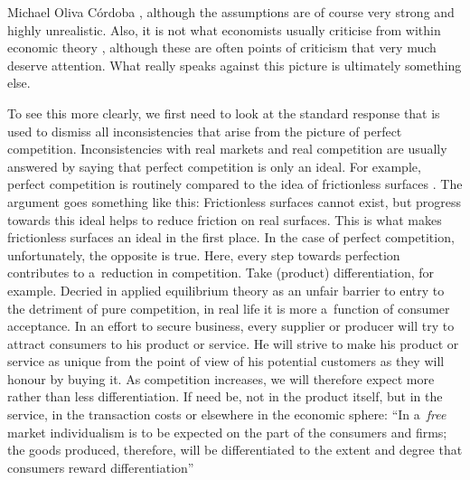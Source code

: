 \begin{artengenv}{Michael Oliva Córdoba}
\parencite[][]{friedman_methodology_1966}, %
 although the assumptions are of course very strong and highly unrealistic. Also, it is not what economists usually criticise from within economic theory 
\parencites[cf., e.g.,][]{ackerman_flawed_2004}[][]{petri_general_2003}, %
 although these are often points of criticism that very much deserve attention. What really speaks against this picture is ultimately something else.



To see this more clearly, we first need to look at the standard response that is used to dismiss all inconsistencies that arise from the picture of perfect competition. Inconsistencies with real markets and real competition are usually answered by saying that perfect competition is only an ideal. For example, perfect competition is routinely compared to the idea of frictionless surfaces 
\parencites[][]{samuelson_foundations_1947}[][]{friedman_methodology_1966}[][]{aumann_markets_1964}[][]{palgrave_macmillan_perfect_2008}. %
 The argument goes something like this: Frictionless surfaces cannot exist, but progress towards this ideal helps to reduce friction on real surfaces. This is what makes frictionless surfaces an ideal in the first place. In the case of perfect competition, unfortunately, the opposite is true. Here, every step towards perfection contributes to a~reduction in competition. Take (product) differentiation, for example. Decried in applied equilibrium theory as an unfair barrier to entry to the detriment of pure competition, in real life it is more a~function of consumer acceptance. In an effort to secure business, every supplier or producer will try to attract consumers to his product or service. He will strive to make his product or service as unique from the point of view of his potential customers as they will honour by buying it. As competition increases, we will therefore expect more rather than less differentiation. If need be, not in the product itself, but in the service, in the transaction costs or elsewhere in the economic sphere: ``In a~\textit{free} market individualism is to be expected on the part of the consumers and firms; the goods produced, therefore, will be differentiated to the extent and degree that consumers reward differentiation'' 

\end{artengenv}
